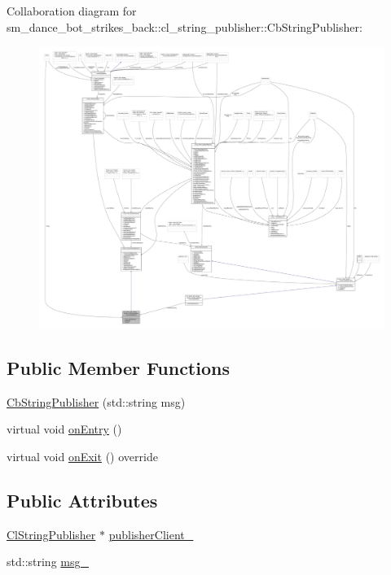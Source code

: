 Collaboration diagram for sm\+\_\+dance\+\_\+bot\+\_\+strikes\+\_\+back\+:\+:cl\+\_\+string\+\_\+publisher\+:\+:Cb\+String\+Publisher\+:
\nopagebreak
\begin{figure}[H]
\begin{center}
\leavevmode
\includegraphics[width=350pt]{classsm__dance__bot__strikes__back_1_1cl__string__publisher_1_1CbStringPublisher__coll__graph}
\end{center}
\end{figure}
\subsection*{Public Member Functions}
\begin{DoxyCompactItemize}
\item 
\hyperlink{classsm__dance__bot__strikes__back_1_1cl__string__publisher_1_1CbStringPublisher_a845fc8ce98f3b9d3bde64119af338068}{Cb\+String\+Publisher} (std\+::string msg)
\item 
virtual void \hyperlink{classsm__dance__bot__strikes__back_1_1cl__string__publisher_1_1CbStringPublisher_a2c3963143fe180a5e5f939362857d2e0}{on\+Entry} ()
\item 
virtual void \hyperlink{classsm__dance__bot__strikes__back_1_1cl__string__publisher_1_1CbStringPublisher_ae4aa02553119822c583bb2abb44c810c}{on\+Exit} () override
\end{DoxyCompactItemize}
\subsection*{Public Attributes}
\begin{DoxyCompactItemize}
\item 
\hyperlink{classsm__dance__bot__strikes__back_1_1cl__string__publisher_1_1ClStringPublisher}{Cl\+String\+Publisher} $\ast$ \hyperlink{classsm__dance__bot__strikes__back_1_1cl__string__publisher_1_1CbStringPublisher_afdbdb3c725b013af9f30fc04d7ab458b}{publisher\+Client\+\_\+}
\item 
std\+::string \hyperlink{classsm__dance__bot__strikes__back_1_1cl__string__publisher_1_1CbStringPublisher_aff05ac35bd920ef24fd9b6464fe83eae}{msg\+\_\+}
\end{DoxyCompactItemize}


